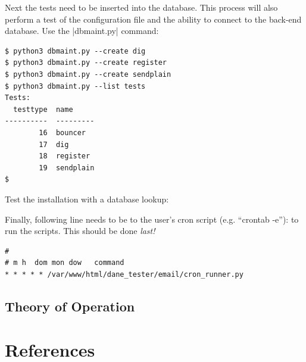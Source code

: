 \documentclass[preprint,3p]{elsarticle}
\begin{document}
Next the tests need to be inserted into the database. This process
will also perform a test of the configuration file and the ability to
connect to the back-end database. Use the |dbmaint.py| command:

\begin{Verbatim}
$ python3 dbmaint.py --create dig
$ python3 dbmaint.py --create register
$ python3 dbmaint.py --create sendplain
$ python3 dbmaint.py --list tests
Tests:
  testtype  name
----------  ---------
        16  bouncer
        17  dig
        18  register
        19  sendplain
$
\end{Verbatim}

Test the installation with a database lookup:


Finally, following line needs to be to the user's cron script
(e.g. ``crontab -e''): to run the scripts. This should be done \emph{last!}

\begin{Verbatim}
#
# m h  dom mon dow   command
* * * * * /var/www/html/dane_tester/email/cron_runner.py
\end{Verbatim}


\subsection{Theory of Operation}

\section*{References}


\end{document}
